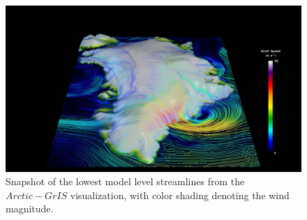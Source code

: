 \documentclass[draft]{agujournal2019}
\begin{document}
\begin{figure}[t]
\begin{center}
         \includegraphics[width=130mm]{figs/Vis1472.jpg}
\end{center}
\caption{Snapshot of the lowest model level streamlines from the $Arctic-GrIS$ visualization, with color shading denoting the wind magnitude.}
\label{fig:viz}
\end{figure}

%
%
%
%


\end{document}
